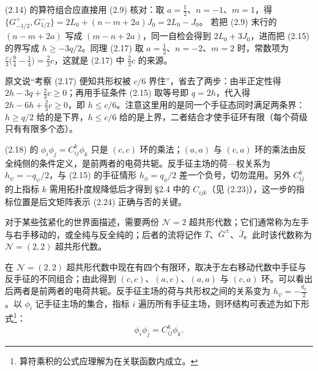 \begin{yizhu}[易错点]
(2.14) 的算符组合应直接用 (2.9) 核对：取 $a=\frac{1}{2}$、$n=-1$、$m=1$，得
$\{G^{+}_{-1/2},G^{-}_{1/2}\}=2L_{0}+(n-m+2a)J_{0}=2L_{0}-J_{0}$。
若把 (2.9) 末行的 $(n-m+2a)$ 写成 $(m-n+2a)$，同一自检会得到 $2L_{0}+3J_{0}$，进而把 (2.15) 的界写成 $h\ge -3q/2$。同理 (2.17) 取 $a=\frac{1}{2}$、$n=-2$、$m=2$ 时，常数项为 $\frac{c}{3}\big(\frac{9}{4}-\frac{1}{4}\big)=\frac{2}{3}c$，这就是 (2.17) 中 $\frac{2}{3}c$ 的来源。
\end{yizhu}

\begin{yizhu}[含糊点]
原文说“考察 (2.17) 便知共形权被 $c/6$ 界住”，省去了两步：由半正定性得 $2h-3q+\frac{2}{3}c\ge 0$；再用手征条件 (2.15) 取等号即 $q=2h$，代入得 $2h-6h+\frac{2}{3}c\ge 0$，即 $h\le c/6$。注意这里用的是同一个手征态同时满足两条界：$h\ge q/2$ 给的是下界，$h\le c/6$ 给的是上界，二者结合才使手征环有限（每个荷级只有有限多个态）。
\end{yizhu}

\begin{yizhu}[易错点]
(2.18) 的 $\phi_{i}\phi_{j}=C^{k}_{ij}\phi_{k}$ 只是 $(c,c)$ 环的乘法；$(a,a)$ 与 $(c,a)$ 环的乘法由反全纯侧的条件定义，是前两者的电荷共轭。反手征主场的荷—权关系为 $h_{\psi}=-q_{\psi}/2$，与 (2.15) 的手征情形 $h_{\phi}=q_{\phi}/2$ 差一个负号，切勿混用。另外 $C^{k}_{ij}$ 的上指标 $k$ 需用拓扑度规降低后才得到 §2.4 中的 $C_{ijk}$（见 (2.23)），这一步的指标位置是后文矩阵表示 (2.24) 正确与否的关键。
\end{yizhu}

对于某些弦紧化的世界面描述，需要两份 $\mathcal{N}=2$ 超共形代数；它们通常称为左手与右手移动的，或全纯与反全纯的；后者的流将记作 $\bar T$、$\bar G^{\pm}$、$\bar J$。此时该代数称为 $\mathcal{N}=(2,2)$ 超共形代数。

在 $\mathcal{N}=(2,2)$ 超共形代数中现在有四个有限环，取决于左右移动代数中手征与反手征的不同组合；由此得到 $(c,c)$、$(a,c)$、$(a,a)$ 与 $(c,a)$ 环。可以看出后两者是前两者的电荷共轭。反手征主场的荷与共形权之间的关系变为 $h_{\psi}=-\frac{q_{\psi}}{2}$。以 $\phi_{i}$ 记手征主场的集合，指标 $i$ 遍历所有手征主场，则环结构可表述为如下形式\footnote{算符乘积的公式应理解为在关联函数内成立。}：
\begin{equation}\tag{2.18}
\phi_{i}\phi_{j}=C^{k}_{ij}\phi_{k}.
\end{equation}

